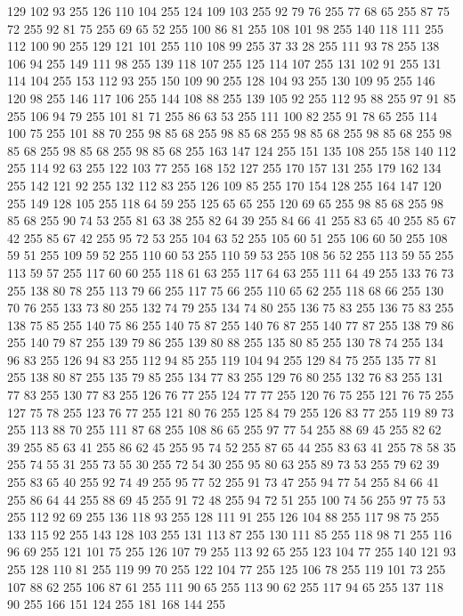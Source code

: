 129 102 93 255 126 110 104 255 124 109 103 255 92 79 76 255 77 68 65 255 87 75 72 255 92 81 75 255 69 65 52 255 100 86 81 255 108 101 98 255 140 118 111 255 112 100 90 255 129 121 101 255 110 108 99 255 37 33 28 255 111 93 78 255 138 106 94 255 149 111 98 255 139 118 107 255 125 114 107 255 131 102 91 255 131 114 104 255 153 112 93 255 150 109 90 255 128 104 93 255 130 109 95 255 146 120 98 255 146 117 106 255 144 108 88 255 139 105 92 255 112 95 88 255 97 91 85 255 106 94 79 255 101 81 71 255 86 63 53 255 111 100 82 255 91 78 65 255 114 100 75 255 101 88 70 255 98 85 68 255 98 85 68 255 98 85 68 255 98 85 68 255 98 85 68 255 98 85 68 255 98 85 68 255 163 147 124 255 151 135 108 255 158 140 112 255 114 92 63 255 122 103 77 255 168 152 127 255 170 157 131 255 179 162 134 255 142 121 92 255 132 112 83 255 126 109 85 255 170 154 128 255 164 147 120 255 149 128 105 255 118 64 59 255 125 65 65 255 120 69 65 255 98 85 68 255
98 85 68 255 90 74 53 255 81 63 38 255 82 64 39 255 84 66 41 255 83 65 40 255 85 67 42 255 85 67 42 255 95 72 53 255 104 63 52 255 105 60 51 255 106 60 50 255 108 59 51 255 109 59 52 255 110 60 53 255 110 59 53 255 108 56 52 255 113 59 55 255 113 59 57 255 117 60 60 255 118 61 63 255 117 64 63 255 111 64 49 255 133 76 73 255 138 80 78 255 113 79 66 255 117 75 66 255 110 65 62 255 118 68 66 255 130 70 76 255 133 73 80 255 132 74 79 255 134 74 80 255 136 75 83 255 136 75 83 255 138 75 85 255 140 75 86 255 140 75 87 255 140 76 87 255 140 77 87 255 138 79 86 255 140 79 87 255 139 79 86 255 139 80 88 255 135 80 85 255 130 78 74 255 134 96 83 255 126 94 83 255 112 94 85 255 119 104 94 255 129 84 75 255 135 77 81 255 138 80 87 255 135 79 85 255 134 77 83 255 129 76 80 255 132 76 83 255 131 77 83 255 130 77 83 255 126 76 77 255 124 77 77 255 120 76 75 255 121 76 75 255 127 75 78 255
123 76 77 255 121 80 76 255 125 84 79 255 126 83 77 255 119 89 73 255 113 88 70 255 111 87 68 255 108 86 65 255 97 77 54 255 88 69 45 255 82 62 39 255 85 63 41 255 86 62 45 255 95 74 52 255 87 65 44 255 83 63 41 255 78 58 35 255 74 55 31 255 73 55 30 255 72 54 30 255 95 80 63 255 89 73 53 255 79 62 39 255 83 65 40 255 92 74 49 255 95 77 52 255 91 73 47 255 94 77 54 255 84 66 41 255 86 64 44 255 88 69 45 255 91 72 48 255 94 72 51 255 100 74 56 255 97 75 53 255 112 92 69 255 136 118 93 255 128 111 91 255 126 104 88 255 117 98 75 255 133 115 92 255 143 128 103 255 131 113 87 255 130 111 85 255 118 98 71 255 116 96 69 255 121 101 75 255 126 107 79 255 113 92 65 255 123 104 77 255 140 121 93 255 128 110 81 255 119 99 70 255 122 104 77 255 125 106 78 255 119 101 73 255 107 88 62 255 106 87 61 255 111 90 65 255 113 90 62 255 117 94 65 255 137 118 90 255 166 151 124 255 181 168 144 255
